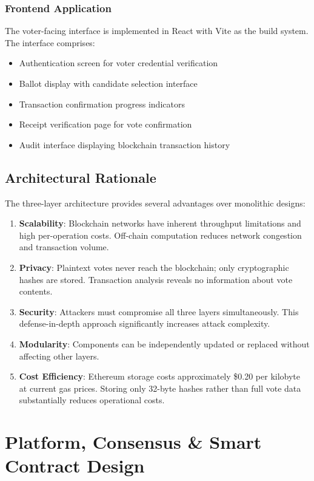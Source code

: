 \documentclass[conference]{IEEEtran}
\begin{document}
\subsubsection{Frontend Application}
The voter-facing interface is implemented in React with Vite as the build system. The interface comprises:
\begin{itemize}
    \item Authentication screen for voter credential verification
    \item Ballot display with candidate selection interface
    \item Transaction confirmation progress indicators
    \item Receipt verification page for vote confirmation
    \item Audit interface displaying blockchain transaction history
\end{itemize}

\subsection{Architectural Rationale}

The three-layer architecture provides several advantages over monolithic designs:

\begin{enumerate}
    \item \textbf{Scalability}: Blockchain networks have inherent throughput limitations and high per-operation costs. Off-chain computation reduces network congestion and transaction volume.
    \item \textbf{Privacy}: Plaintext votes never reach the blockchain; only cryptographic hashes are stored. Transaction analysis reveals no information about vote contents.
    \item \textbf{Security}: Attackers must compromise all three layers simultaneously. This defense-in-depth approach significantly increases attack complexity.
    \item \textbf{Modularity}: Components can be independently updated or replaced without affecting other layers.
    \item \textbf{Cost Efficiency}: Ethereum storage costs approximately \$0.20 per kilobyte at current gas prices. Storing only 32-byte hashes rather than full vote data substantially reduces operational costs.
\end{enumerate}

\section{Platform, Consensus \& Smart Contract Design}
\end{document}
